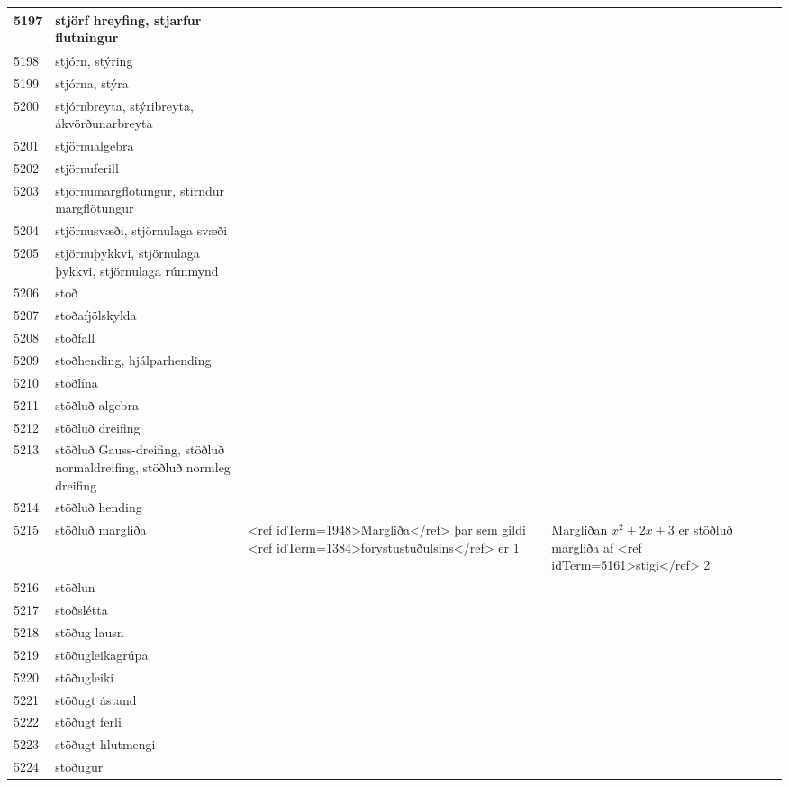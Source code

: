 \begin{longtable}{p{}|p{}|p{}|p{}|p{}}
5197 & stjörf hreyfing, stjarfur flutningur &  &  &  \\
\hline
5198 & stjórn, stýring &  &  &  \\
\hline
5199 & stjórna, stýra &  &  &  \\
\hline
5200 & stjórnbreyta, stýribreyta, ákvörðunarbreyta &  &  &  \\
\hline
5201 & stjörnualgebra &  &  &  \\
\hline
5202 & stjörnuferill &  &  &  \\
\hline
5203 & stjörnumargflötungur, stirndur margflötungur &  &  &  \\
\hline
5204 & stjörnusvæði, stjörnulaga svæði &  &  &  \\
\hline
5205 & stjörnuþykkvi, stjörnulaga þykkvi, stjörnulaga rúmmynd &  &  &  \\
\hline
5206 & stoð &  &  &  \\
\hline
5207 & stoðafjölskylda &  &  &  \\
\hline
5208 & stoðfall &  &  &  \\
\hline
5209 & stoðhending, hjálparhending &  &  &  \\
\hline
5210 & stoðlína &  &  &  \\
\hline
5211 & stöðluð algebra &  &  &  \\
\hline
5212 & stöðluð dreifing &  &  &  \\
\hline
5213 & stöðluð Gauss-dreifing, stöðluð normaldreifing, stöðluð normleg dreifing &  &  &  \\
\hline
5214 & stöðluð hending &  &  &  \\
\hline
5215 & stöðluð margliða & <ref idTerm=1948>Margliða</ref> þar sem gildi <ref idTerm=1384>forystustuðulsins</ref> er 1 & Margliðan $x^2 + 2 x + 3$ er stöðluð margliða af <ref idTerm=5161>stigi</ref> 2 & \\
\hline
5216 & stöðlun &  &  &  \\
\hline
5217 & stoðslétta &  &  &  \\
\hline
5218 & stöðug lausn &  &  &  \\
\hline
5219 & stöðugleikagrúpa &  &  &  \\
\hline
5220 & stöðugleiki &  &  &  \\
\hline
5221 & stöðugt ástand &  &  &  \\
\hline
5222 & stöðugt ferli &  &  &  \\
\hline
5223 & stöðugt hlutmengi &  &  &  \\
\hline
5224 & stöðugur &  &  &  \\

\end{longtable}
